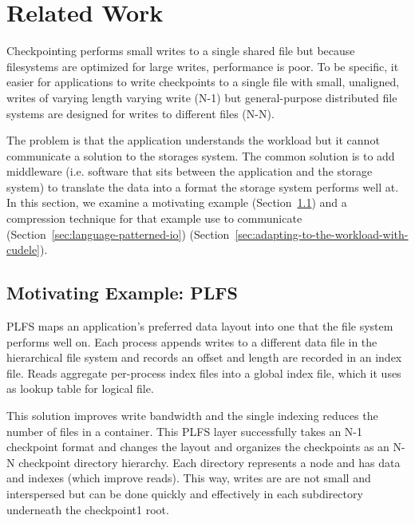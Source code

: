 \section{Related Work}

Checkpointing performs small writes to a single shared file but because
filesystems are optimized for large writes, performance is poor. To be
specific, it easier for applications to write checkpoints to a single file with
small, unaligned, writes of varying length varying write (N-1) but
general-purpose distributed file systems are designed for writes to different
files (N-N).

The problem is that the application understands the workload but it cannot
communicate a solution to the storages system. The common solution is to add
middleware (i.e. software that sits between the application and the storage
system) to translate the data into a format the storage system performs well
at. In this section, we examine a motivating example
(Section~\ref{sec:motivating-example-plfs}) and a compression technique for that example
use to communicate (Section~\ref{sec:language-patterned-io})
(Section~\ref{sec:adapting-to-the-workload-with-cudele}).  

\subsection{Motivating Example: PLFS}
\label{sec:motivating-example-plfs}

PLFS maps an application's preferred data layout into one that the file system
performs well on. Each process appends writes to a different data file in the
hierarchical file system and records an offset and length are recorded in an
index file. Reads aggregate per-process index files into a global index file,
which it uses as lookup table for logical file. 

This solution improves write bandwidth and the single indexing reduces the
number of files in a container. This PLFS layer successfully takes an N-1
checkpoint format and changes the layout and organizes the checkpoints as an
N-N checkpoint directory hierarchy. Each directory represents a node and has
data and indexes (which improve reads). This way, writes are are not small and
interspersed but can be done quickly and effectively in each subdirectory
underneath the checkpoint1 root.

